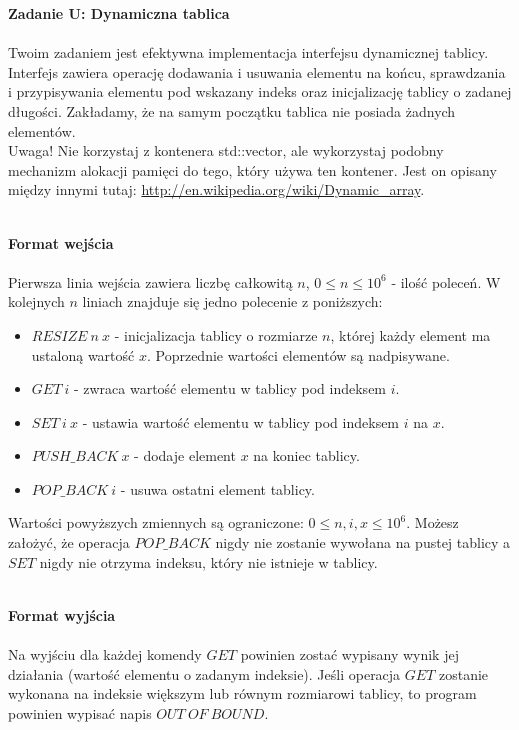 \documentclass[
  fontsize=12pt  %
 ,english        %
 ,headinclude    %
 ,headsepline    %
]{scrbook}       %
\begin{document}
\vspace{50 mm}
\hspace{50 mm}
\newline

\par{\Large \textbf{Zadanie U: Dynamiczna tablica}} \\ \\
Twoim zadaniem jest efektywna implementacja interfejsu dynamicznej tablicy. Interfejs zawiera operację dodawania i usuwania elementu na końcu, sprawdzania i przypisywania elementu pod wskazany indeks oraz inicjalizację tablicy o zadanej długości. Zakładamy, że na samym początku tablica nie posiada żadnych elementów.
\\
Uwaga! Nie korzystaj z kontenera std::vector, ale wykorzystaj podobny mechanizm alokacji pamięci do tego, który używa ten kontener. Jest on opisany między innymi tutaj: \url{http://en.wikipedia.org/wiki/Dynamic_array}.
\\ \\
\par{\Large \textbf{Format wejścia}} \\ \\
Pierwsza linia wejścia zawiera liczbę całkowitą $n$, $0 \leq n \leq 10^6$ - ilość poleceń. W kolejnych $n$ liniach znajduje się jedno polecenie z poniższych:
\begin{itemize}
  \item $RESIZE \ n \ x$ - inicjalizacja tablicy o rozmiarze $n$, której każdy element ma ustaloną wartość $x$. Poprzednie wartości elementów są nadpisywane.
  \item $GET \ i$ - zwraca wartość elementu w tablicy pod indeksem $i$.
  \item $SET \ i \ x$ - ustawia wartość elementu w tablicy pod indeksem $i$ na $x$.
  \item $PUSH\_BACK \ x$ - dodaje element $x$ na koniec tablicy.
  \item $POP\_BACK \ i$ - usuwa ostatni element tablicy.
\end{itemize}

Wartości powyższych zmiennych są ograniczone: $0 \leq n, i, x \leq 10^6$. Możesz założyć, że operacja $POP\_BACK$ nigdy nie zostanie wywołana na pustej tablicy a $SET$ nigdy nie otrzyma indeksu, który nie istnieje w tablicy.
\\ \\
\par{\Large \textbf{Format wyjścia}} \\ \\
Na wyjściu dla każdej komendy $GET$ powinien zostać wypisany wynik jej działania (wartość elementu o zadanym indeksie). Jeśli operacja $GET$ zostanie wykonana na indeksie większym lub równym rozmiarowi tablicy, to program powinien wypisać napis $OUT \ OF \ BOUND$.
~\\
\vspace{50 mm}
\hspace{50 mm}
\newline
\newline
\end{document}
